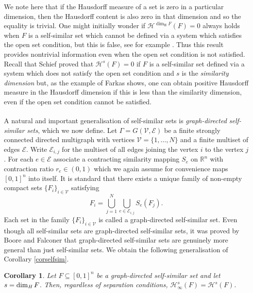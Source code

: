 \documentclass[11pt,english,british]{article}
\numberwithin{equation}{section}
\newtheorem{cor}[thm]{Corollary}
\begin{document}
We note here that if the Hausdorff measure of a set is zero in a particular dimension, then the Hausdorff content is also zero in that dimension and so the equality is trivial.  One might initially wonder if $ \mathcal{H}^{\dim_\text{H}F} (F)=0$ always holds when $F$ is a self-similar set which cannot be defined via a system which satisfies the open set condition, but this is false, see for example \cite[Example 8.6]{farkas}.  Thus this result provides nontrivial information even when the open set condition is not satisfied.  Recall that Schief \cite{schief} proved that $ \mathcal{H}^{s} (F)=0$ if $F$ is a self-similar set defined via a system which does not satisfy the open set condition and $s$ is the \emph{similarity dimension} but, as the example of Farkas shows, one can obtain positive Hausdorff measure in the Hausdorff dimension if this is less than the similarity dimension, even if the open set condition cannot be satisfied.
\\ \\
A natural and important generalisation of self-similar sets is \emph{graph-directed self-similar sets}, which we now define.  Let $\Gamma = G(\mathcal{V}, \mathcal{E})$ be a finite strongly connected directed multigraph with vertices $\mathcal{V} = \{1, \dots, N\}$ and a finite multiset of edges $ \mathcal{E}$.  Write $\mathcal{E}_{i,j}$ for the multiset of all edges joining the vertex $i$ to the vertex $j$. For each $e \in \mathcal{E}$ associate a contracting similarity mapping $S_e$ on $\mathbb{R}^n$ with contraction ratio $r_e \in (0,1)$ which we again assume for convenience maps $[0,1]^n$ into itself.  It is standard that there exists a unique family of non-empty compact sets $\{F_{i}\}_{i  \in \mathcal{V}}$ satisfying
\begin{equation}
F_i = \bigcup_{j = 1}^{N} \bigcup_{e \in \mathcal{E}_{i,j}} S_e(F_j). \label{ssc-gda}
\end{equation}
Each set in the family $\{F_{i}\}_{i  \in \mathcal{V}}$ is called a graph-directed self-similar set.  Even though all self-similar sets are graph-directed self-similar sets, it was proved by Boore and Falconer \cite{boore} that graph-directed self-similar sets are genuinely more general than just self-similar sets.  We obtain the following generalisation of Corollary \ref{corselfsim}.

\begin{cor} \label{corgdselfsim}
Let $F \subseteq [0,1]^n$ be a graph-directed self-similar set and let $s = \dim_\text{\emph{H}} F$.  Then, regardless of separation conditions, $\mathcal{H}_\infty^s (F) =  \mathcal{H}^s (F)$.
\end{cor}
\end{document}
